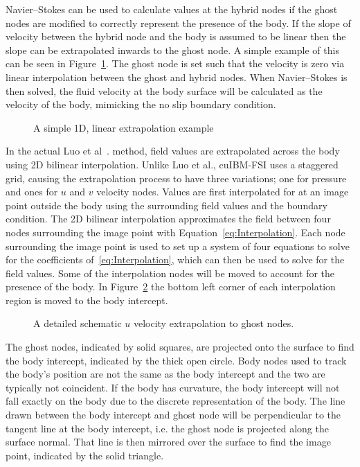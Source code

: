 Navier--Stokes can be used to calculate values at the hybrid nodes if the ghost nodes are modified to correctly represent the presence of the body. 
If the slope of velocity between the hybrid node and the body is assumed to be linear then the slope can be extrapolated inwards to the ghost node. 
A simple example of this can be seen in Figure~\ref{Fig: Simple Interpolation}. 
The ghost node is set such that the velocity is zero via linear interpolation between the ghost and hybrid nodes. 
When Navier--Stokes is then solved, the fluid velocity at the body surface will be calculated as the velocity of the body, mimicking the no slip boundary condition. 
\begin{figure}[!htb]
	\centering
	
	\caption{A simple 1D, linear extrapolation example}
	\label{Fig: Simple Interpolation}
\end{figure}
In the actual Luo et al~\cite{Luo:2012gx}. method, field values are extrapolated across the body using 2D bilinear interpolation.
Unlike Luo et al., cuIBM-FSI uses a staggered grid, causing the extrapolation process to have three variations; one for pressure and ones for $u$ and $v$ velocity nodes. 
Values are first interpolated for at an image point outside the body using the surrounding field values and the boundary condition. 
The 2D bilinear interpolation approximates the field between four nodes surrounding the image point with Equation~\eqref{eq:Interpolation}. 
Each node surrounding the image point is used to set up a system of four equations to solve for the coefficients of~\eqref{eq:Interpolation}, which can then be used to solve for the field values. 
Some of the interpolation nodes will be moved to account for the presence of the body.
In Figure~\ref{fig:Ghost node extrapolation} the bottom left corner of each interpolation region is moved to the body intercept.
\begin{figure}[htb]
	\centering
	
	\caption{A detailed schematic $u$ velocity extrapolation to ghost nodes.}
	\label{fig:Ghost node extrapolation}
\end{figure}

The ghost nodes, indicated by solid squares, are projected onto the surface to find the body intercept, indicated by the thick open circle. 
Body nodes used to track the body's position are not the same as the body intercept and the two are typically not coincident. 
If the body has curvature, the body intercept will not fall exactly on the body due to the discrete representation of the body. 
The line drawn between the body intercept and ghost node will be perpendicular to the tangent line at the body intercept, i.e. the ghost node is projected along the surface normal. 
That line is then mirrored over the surface to find the image point, indicated by the solid triangle. 

